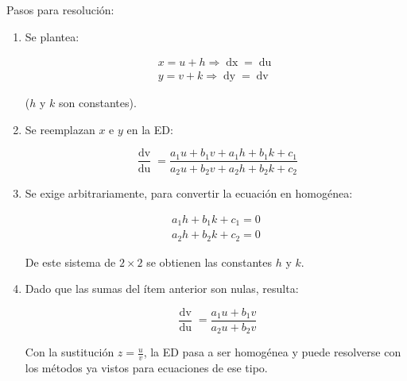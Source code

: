 \documentclass{article}
\begin{document}
Pasos para resolución:

\begin{enumerate}
\item Se plantea:

\begin{equation}
\begin{array}{ll}
x = u + h \Rightarrow \mathop{dx} = \mathop{du} \\
y = v + k \Rightarrow \mathop{dy} = \mathop{dv}
\end{array}
\end{equation}

($h$ y $k$ son constantes).

\item Se reemplazan $x$ e $y$ en la ED:

\begin{equation}
\frac{\mathop{dv}}{\mathop{du}} = \frac{a_1 u + b_1 v + a_1 h + b_1 k + c_1}{a_2 u + b_2 v + a_2 h + b_2 k + c_2}
\end{equation}

\item Se exige arbitrariamente, para convertir la ecuación en homogénea:

\begin{equation}
\begin{array}{ll}
a_1 h + b_1 k + c_1 = 0 \\
a_2 h + b_2 k + c_2 = 0
\end{array}
\end{equation}

De este sistema de $2 \times 2$ se obtienen las constantes $h$ y $k$.

\item Dado que las sumas del ítem anterior son nulas, resulta:

\begin{equation}
\frac{\mathop{dv}}{\mathop{du}} = \frac{a_1 u + b_1 v}{a_2 u + b_2 v}
\end{equation}

Con la sustitución $z = \frac{u}{v}$, la ED pasa a ser homogénea y puede resolverse con los métodos ya vistos para ecuaciones de ese tipo.

\end{enumerate}
\end{document}
